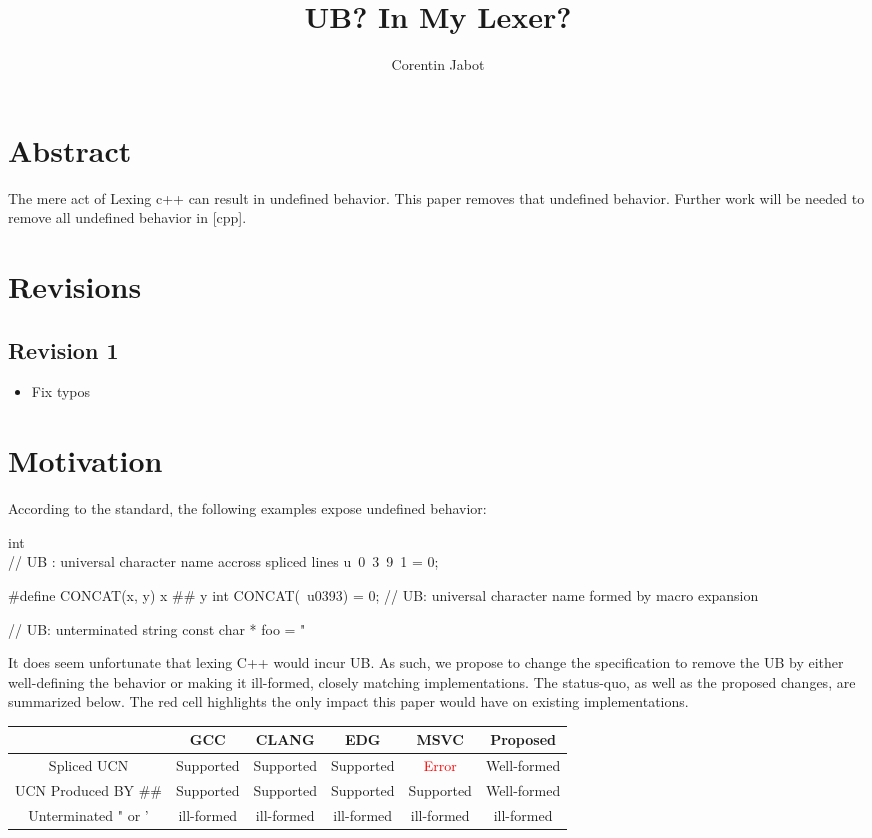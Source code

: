 \documentclass{wg21}
\title{UB? In My Lexer?}
\author{Corentin Jabot}{corentin.jabot@gmail.com}
\begin{document}
\maketitle

\section{Abstract}

The mere act of Lexing c++ can result in undefined behavior.
This paper removes that undefined behavior.
Further work will be needed to remove all undefined behavior in [cpp].


\section{Revisions}

\subsection*{Revision 1}
\begin{itemize}
\item Fix typos
\end{itemize}


\section {Motivation}

According to the standard, the following examples expose undefined behavior:

\begin{colorblock}
int \\ // UB : universal character name accross spliced lines
u\
0\
3\
9\
1 = 0;


#define CONCAT(x, y) x ## y
int CONCAT(\, u0393) = 0; // UB: universal character name formed by macro expansion

// UB: unterminated string
const char * foo = "
\end{colorblock}

It does seem unfortunate that lexing C++ would incur UB.
As such, we propose to change the specification to remove the UB by either well-defining the behavior or making it ill-formed,
closely matching implementations.
The status-quo, as well as the proposed changes, are summarized below.
The red cell highlights the only impact this paper would have on existing implementations.

\renewcommand*\arraystretch{1.4}
\begin{tabular}{|c|c|c|c|c|c|}
     \cline{2-6}
    \multicolumn{1}{c|}{} & GCC & CLANG & EDG & MSVC & Proposed \\
    \hline
    Spliced UCN & Supported & Supported & Supported & \textcolor{red}{Error} & Well-formed \\
    \hline
    UCN Produced BY \#\# & Supported & Supported & Supported & Supported & Well-formed \\
    \hline
    Unterminated " or ' & ill-formed & ill-formed & ill-formed & ill-formed & ill-formed \\
    \hline
\end{tabular}\\
\end{document}
